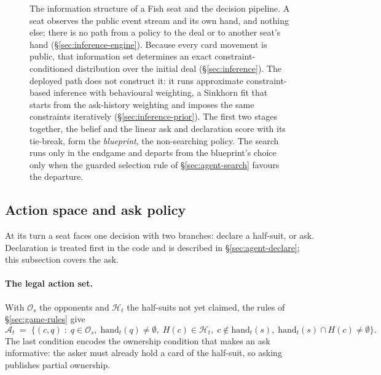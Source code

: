 \begin{figure}[!ht]
\caption{The information structure of a Fish seat and the \sestina{} decision pipeline. A seat
observes the public event stream and its own hand, and nothing else; there is no path from a policy to
the deal or to another seat's hand (\S\ref{sec:inference-engine}). Because every card movement is
public, that information set determines an exact constraint-conditioned distribution over the
initial deal (\S\ref{sec:inference}). The deployed path does not construct it: it runs approximate
constraint-based inference with behavioural weighting, a Sinkhorn fit that starts from the
ask-history weighting and imposes the same constraints iteratively (\S\ref{sec:inference-prior}).
The first two stages together, the belief and the linear ask and declaration score with its
tie-break, form the \emph{blueprint}, the non-searching policy. The search runs only in the endgame
and departs from the blueprint's choice only when the guarded selection rule of
\S\ref{sec:agent-search} favours the departure.}
\label{fig:pipeline}
\end{figure}

\begin{table}[!ht]\centering
\caption{Components of \sestina{} against \vsix{}. Harness identifiers appear in parentheses and
are used in the paper only where a command must be reproduced.}
\label{tab:components}
{\tabfont}
\end{table}

\subsection{Action space and ask policy}
\label{sec:agent-policy}

At its turn a seat faces one decision with two branches: declare a half-suit, or ask. Declaration is
treated first in the code and is described in \S\ref{sec:agent-declare}; this subsection covers the
ask.

\paragraph{The legal action set.} With $\mathcal{O}_s$ the opponents and $\mathcal{H}_t$ the
half-suits not yet claimed, the rules of \S\ref{sec:game-rules} give
\begin{equation}
  \mathcal{A}_t \;=\; \bigl\{(c,q) \;:\; q \in \mathcal{O}_s,\; \text{hand}_t(q) \neq \emptyset,\;
  H(c) \in \mathcal{H}_t,\; c \notin \text{hand}_t(s),\;
  \text{hand}_t(s) \cap H(c) \neq \emptyset \bigr\}.
  \label{eq:legal}
\end{equation}
The last condition encodes the ownership condition that makes an ask informative: the asker must
already hold a card of the half-suit, so asking publishes partial ownership.

